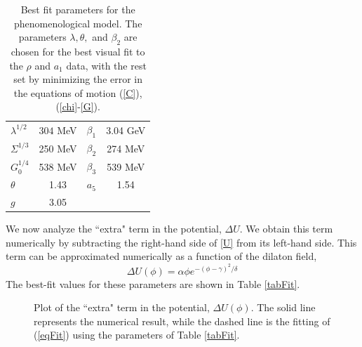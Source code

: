 \documentclass[aps,prd,12pt,nofootinbib]{revtex4}
\newcommand{\be}{\begin{equation}}
\newcommand{\ee}{\end{equation}}
\begin{document}
\begin{table}[htb]
\begin{center}
\begin{tabular}{| l | c || c | c | }
\hline
  $\lambda^{1/2}$ & $304$ MeV & $\beta_1$ & 3.04 GeV  \\
  $\Sigma^{1/3}$ &  250 MeV & $\beta_2$ & 274 MeV \\
  $G_0^{1/4}$ & 538 MeV & $\beta_3$ & 539 MeV \\
 $ \theta $& 1.43 &  $a_5$ & 1.54 \\
  $g $& 3.05 & & \\
  \hline
\end{tabular}
\caption{Best fit parameters for the phenomenological model. 
The parameters $\lambda, \theta,$ and $ \beta_2$ are chosen for the best visual fit to the $\rho$ and $a_1$ data, with the rest set by minimizing the error in the equations of motion (\ref{C}), (\ref{chi}-\ref{G}). }
\label{tabParam}
\end{center}
\end{table}


We now analyze the ``extra" term in the potential, $\Delta U$. 
We obtain this term numerically by subtracting the right-hand side of \ref{U} from its left-hand side.
This term can be approximated numerically as a function of the dilaton field, 
\be
\Delta U\left(\phi\right) = \alpha \phi e^{-\left(\phi-\gamma\right)^2/\delta } %
\label{eqFit}
\ee
The best-fit values for these parameters are shown in Table \ref{tabFit}.

\begin{figure}[htb]
\caption{Plot of the ``extra" term in the potential, $\Delta U(\phi)$. The solid line represents the numerical result, while the dashed line is the fitting of (\ref{eqFit}) using the parameters of Table \ref{tabFit}.}
\label{figdeltaU}
\end{figure}
\end{document}
